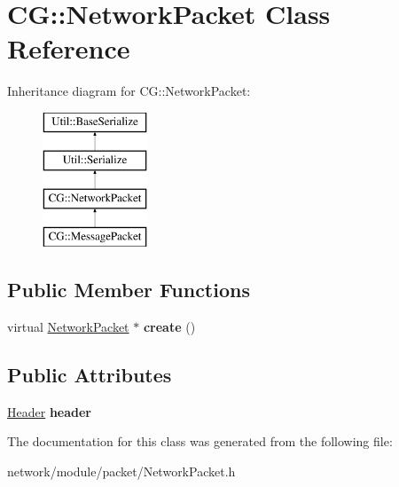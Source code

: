 \hypertarget{class_c_g_1_1_network_packet}{}\section{CG\+:\+:Network\+Packet Class Reference}
\label{class_c_g_1_1_network_packet}
Inheritance diagram for CG\+:\+:Network\+Packet\+:\begin{figure}[H]
\begin{center}
\leavevmode
\includegraphics[height=4.000000cm]{class_c_g_1_1_network_packet}
\end{center}
\end{figure}
\subsection*{Public Member Functions}
\begin{DoxyCompactItemize}
\item 
\mbox{\label{class_c_g_1_1_network_packet_a3c9a8ab2f895276adcc9f46ad0d90762}} 
virtual \mbox{\hyperlink{class_c_g_1_1_network_packet}{Network\+Packet}} $\ast$ {\bfseries create} ()
\end{DoxyCompactItemize}
\subsection*{Public Attributes}
\begin{DoxyCompactItemize}
\item 
\mbox{\label{class_c_g_1_1_network_packet_a79bfb6a2ab70562c2a9eaf3d13dbd224}} 
\mbox{\hyperlink{class_c_g_1_1_header}{Header}} {\bfseries header}
\end{DoxyCompactItemize}


The documentation for this class was generated from the following file\+:\begin{DoxyCompactItemize}
\item 
network/module/packet/Network\+Packet.\+h\end{DoxyCompactItemize}
